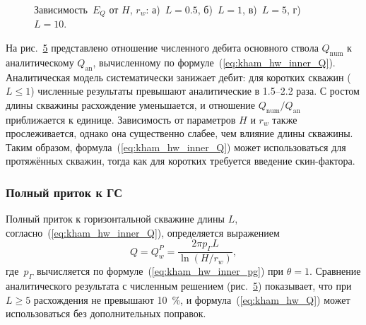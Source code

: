 \documentclass{article}
\begin{document}
\begin{figure}[H]
	\centering
	\begin{subfigure}{0.48\textwidth}
		
		\caption{}
		\label{fig:kham_hw_pipe_edge_effect_L0.5_mrst}
	\end{subfigure}
	\hfill
	\begin{subfigure}{0.48\textwidth}
		
		\caption{}
		\label{fig:kham_hw_pipe_edge_effect_L1_mrst}
	\end{subfigure}

	\begin{subfigure}{0.48\textwidth}
		
		\caption{}
		\label{fig:kham_hw_pipe_edge_effect_L5_mrst}
	\end{subfigure}
	\hfill
	\begin{subfigure}{0.48\textwidth}
		
		\caption{}
		\label{fig:kham_hw_pipe_edge_effect_L10_mrst}
	\end{subfigure}

	\caption{
		Зависимость~$E_Q$ от $H$, $r_w$: а)~$L=0.5$, б)~$L=1$, в)~$L=5$, г)~$L=10$.
	}
	\label{fig:kham_hw_pipe_edge_effects_mrst}
\end{figure}

На рис.~\ref{fig:kham_hw_pipe_edge_effects_mrst} представлено отношение численного дебита
основного ствола $Q_{\text{num}}$ к аналитическому $Q_{\text{an}}$, вычисленному по формуле~(\ref{eq:kham_hw_inner_Q}).
Аналитическая модель систематически занижает дебит: для коротких скважин ($L \leq 1$) численные результаты
превышают аналитические в 1.5--2.2 раза. С ростом длины скважины расхождение уменьшается, и
отношение $Q_{\text{num}}/Q_{\text{an}}$ приближается к единице.
Зависимость от параметров $H$ и $r_w$ также прослеживается, однако она существенно слабее,
чем влияние длины скважины. Таким образом, формула~(\ref{eq:kham_hw_inner_Q})
может использоваться для протяжённых скважин, тогда как для коротких требуется введение скин-фактора.

\subsubsection{Полный приток к ГС}

Полный приток к горизонтальной скважине длины $L$, согласно~(\ref{eq:kham_hw_inner_Q}), определяется выражением
\begin{equation}
	\displaystyle
	Q = Q_w^P = \dfrac{2 \pi p_{\Gamma} L}{\ln \left( H / r_w \right)},
	\label{eq:kham_hw_Q}
\end{equation}
где~$p_{\Gamma}$ вычисляется по формуле~(\ref{eq:kham_hw_inner_pg}) при $\theta=1$.
Сравнение аналитического результата с численным решением (рис.~\ref{fig:kham_hw_pipe_edge_effects_mrst})
показывает, что при $L \geq 5$ расхождения не превышают 10~\%, и формула~(\ref{eq:kham_hw_Q})
может использоваться без дополнительных поправок.
\end{document}
